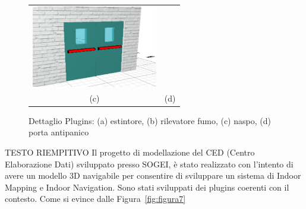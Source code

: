 \begin{figure}[htbp]
\begin{center}
\begin{tabular}{c @{\hspace{1em}} c}
\includegraphics[width=5.5cm]{images/panicDoorDouble} \\
 (c) & (d) \\
\end{tabular}
\end{center}
\caption{Dettaglio Plugins: (a) estintore, (b) rilevatore fumo, (c) naspo, (d) porta antipanico}\label{fig:figura6}
\end{figure}

TESTO RIEMPITIVO
Il progetto di modellazione del CED (Centro Elaborazione Dati) sviluppato presso SOGEI, \`e stato realizzato con l'intento
di avere un modello 3D navigabile per consentire di sviluppare un sistema di Indoor Mapping e Indoor Navigation.
Sono stati sviluppati dei plugins coerenti con il contesto.
Come si evince dalle Figura~\ref{fig:figura7}


